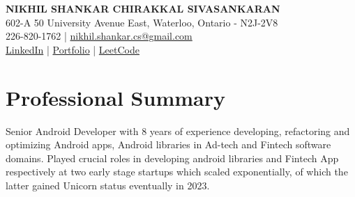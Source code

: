 \documentclass[11pt,a4paper]{article}
\begin{document}
\begin{center}
    \textbf{\huge NIKHIL SHANKAR CHIRAKKAL SIVASANKARAN} \\
    \vspace{6pt}
    \small 602-A 50 University Avenue East, Waterloo, Ontario - N2J-2V8 \\
    \small 226-820-1762 | \href{mailto:nikhil.shankar.cs@gmail.com}{nikhil.shankar.cs@gmail.com} \\
    \small \href{https://www.linkedin.com/in/nikhilshankarcs}{LinkedIn} | \href{https://yourportfolio.com}{Portfolio} | \href{https://leetcode.com/yourprofile}{LeetCode}
\end{center}

\section{Professional Summary}
Senior Android Developer with 8 years of experience developing, refactoring and optimizing Android apps, Android libraries in Ad-tech and Fintech software domains. Played crucial roles in developing android libraries and Fintech App respectively at two early stage startups which scaled exponentially, of which the latter gained Unicorn status eventually in 2023.

\end{document}

